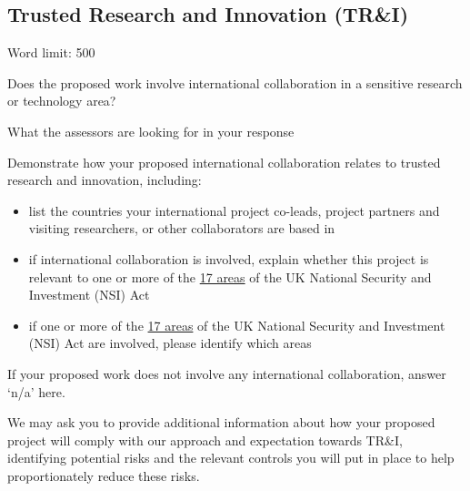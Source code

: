 \documentclass[12in]{article}
\begin{document}
\pagebreak

\subsection{Trusted Research and Innovation (TR\&I)}

{\color{red}

Word limit: 500

Does the proposed work involve international collaboration in a sensitive
research or technology area?

What the assessors are looking for in your response

Demonstrate how your proposed international collaboration relates to trusted
research and innovation, including:

\begin{itemize}

	\item list the countries your international project co-leads, project partners and
visiting researchers, or other collaborators are based in

	\item if international collaboration is involved, explain whether this project is
relevant to one or more of the \href{https://www.gov.uk/government/publications/national-security-and-investment-act-guidance-on-notifiable-acquisitions/national-security-and-investment-act-guidance-on-notifiable-acquisitions}{17 areas} of the UK National Security and
Investment (NSI) Act

	\item if one or more of the \href{https://www.gov.uk/government/publications/national-security-and-investment-act-guidance-on-notifiable-acquisitions/national-security-and-investment-act-guidance-on-notifiable-acquisitions}{17 areas} of the UK National Security and Investment
(NSI) Act are involved, please identify which areas

\end{itemize}

If your proposed work does not involve any international collaboration, answer
‘n/a’ here.

We may ask you to provide additional information about how your proposed
project will comply with our approach and expectation towards TR\&I, identifying
potential risks and the relevant controls you will put in place to help
proportionately reduce these risks.

}
\end{document}
